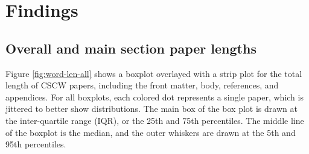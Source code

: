 \documentclass[format=acmsmall, screen=true]{acmart}
\begin{document}
\section{Findings}

\subsection{Overall and main section paper lengths}

Figure \ref{fig:word-len-all} shows a boxplot overlayed with a strip plot for the total length of CSCW papers, including the front matter, body, references, and appendices. For all boxplots, each colored dot represents a single paper, which is jittered to better show distributions. The main box of the box plot is drawn at the inter-quartile range (IQR), or the 25th and 75th percentiles. The middle line of the boxplot is the median, and the outer whiskers are drawn at the 5th and 95th percentiles. 
\end{document}
